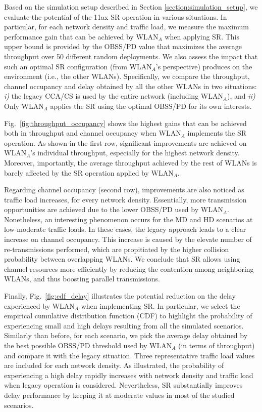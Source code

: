 \documentclass[conference]{IEEEtran}
\begin{document}
	Based on the simulation setup described in Section \ref{section:simulation_setup}, we evaluate the potential of the 11ax SR operation in various situations. In particular, for each network density and traffic load, we measure the maximum performance gain that can be achieved by WLAN$_A$ when applying SR. This upper bound is provided by the OBSS/PD value that maximizes the average throughput over 50 different random deployments. We also assess the impact that such an optimal SR configuration (from WLAN$_A$'s perspective) produces on the environment (i.e., the other WLANs). Specifically, we compare the throughput, channel occupancy and delay obtained by all the other WLANs in two situations: \emph{i)} the legacy CCA/CS is used by the entire network (including WLAN$_A$), and \emph{ii)} Only WLAN$_A$ applies the SR using the optimal OBSS/PD for its own interests.
	
	Fig.~\ref{fig:throughput_occupancy} shows the highest gains that can be achieved both in throughput and channel occupancy when WLAN$_A$ implements the SR operation. As shown in the first row, significant improvements are achieved on WLAN$_A$'s individual throughput, especially for the highest network density. Moreover, importantly, the average throughput achieved by the rest of WLANs is barely affected by the SR operation applied by WLAN$_A$. 
	
	Regarding channel occupancy (second row), improvements are also noticed as traffic load increases, for every network density. Essentially, more transmission opportunities are achieved due to the lower OBSS/PD used by WLAN$_A$. Nonetheless, an interesting phenomenon occurs for the MD and HD scenarios at low-moderate traffic loads. In these cases, the legacy approach leads to a clear increase on channel occupancy. This increase is caused by the elevate number of re-transmissions performed, which are propitiated by the higher collision probability between overlapping WLANs. We conclude that SR allows using channel resources more efficiently by reducing the contention among neighboring WLANs, and thus boosting parallel transmissions.
	
	Finally, Fig.~\ref{fig:cdf_delay} illustrates the potential reduction on the delay experienced by WLAN$_A$ when implementing SR. In particular, we select the empirical cumulative distribution function (CDF) to highlight the probability of experiencing small and high delays resulting from all the simulated scenarios. Similarly than before, for each scenario, we pick the average delay obtained by the best possible OBSS/PD threshold used by WLAN$_A$ (in terms of throughput) and compare it with the legacy situation. Three representative traffic load values are included for each network density. As illustrated, the probability of experiencing a high delay rapidly increases with network density and traffic load when legacy operation is considered. Nevertheless, SR substantially improves delay performance by keeping it at moderate values in most of the studied scenarios.
\end{document}
